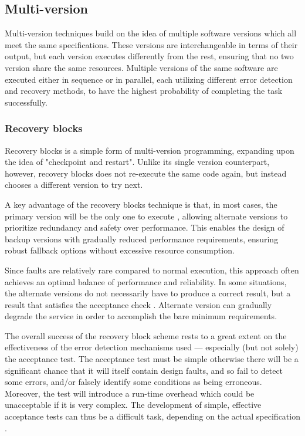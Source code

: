 \subsection{Multi-version} \label{multi}

Multi-version techniques build on the idea of multiple software versions which all meet the same specifications. These versions are interchangeable in terms of their output, but each version executes differently from the rest, ensuring that no two version share the same resources.
Multiple versions of the same software are executed either in sequence or in parallel, each utilizing different error detection and recovery methods, to have the highest probability of completing the task successfully.

\subsubsection{Recovery blocks}

Recovery blocks is a simple form of multi-version programming, expanding upon the idea of "checkpoint and restart". Unlike its single version counterpart, however, recovery blocks does not re-execute the same code again, but instead chooses a different version to try next.

A key advantage of the recovery blocks technique is that, in most cases, the primary version will be the only one to execute \cite{lyu:sft}, allowing alternate versions to prioritize redundancy and safety over performance. This enables the design of backup versions with gradually reduced performance requirements, ensuring robust fallback options without excessive resource consumption.



Since faults are relatively rare compared to normal execution, this approach often achieves an optimal balance of performance and reliability. In some situations, the alternate versions do not necessarily have to produce a correct result, but a result that satisfies the acceptance check \cite{lyu:sft}. Alternate version can gradually degrade the service in order to accomplish the bare minimum requirements.

The overall success of the recovery block scheme rests to a great extent on the effectiveness of the error detection mechanisms used — especially (but not solely) the acceptance test. The acceptance test must be simple otherwise there will be a significant chance that it will itself contain design faults, and so fail to detect some errors, and/or falsely identify some conditions as being erroneous. Moreover, the test will introduce a run-time overhead which could be unacceptable if it is very complex. The development of simple, effective acceptance tests can thus be a difficult task, depending on the actual specification \cite{lyu:sft}.

